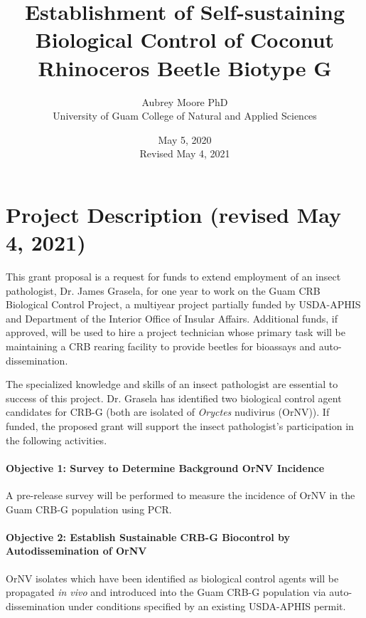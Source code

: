 \documentclass[12pt,letterpaper,english,bibliography=totocnumbered, abstract=on]{scrartcl}
\begin{document}
\titlehead{Work Plan: USDA Forest Service FY2020}

\title{Establishment of Self-sustaining Biological Control of Coconut Rhinoceros Beetle Biotype G}

\author{Aubrey Moore PhD\\University of Guam College of Natural and Applied Sciences}

\date{May 5, 2020\\Revised May 4, 2021}

\maketitle
\newpage
\tableofcontents

\pagebreak

\section{Project Description (revised May 4, 2021)}

This grant proposal is a request for funds to extend employment of an insect pathologist,
Dr. James Grasela, for one year to work on the Guam CRB Biological Control Project, a multiyear project partially funded by
USDA-APHIS and Department of the Interior Office of Insular Affairs. Additional funds, if approved, will be used to hire a project technician whose primary task will be maintaining a CRB rearing facility to provide beetles for bioassays and auto-dissemination.

The specialized knowledge and skills of an insect pathologist are essential to success of this project. 
Dr. Grasela has identified two biological control agent candidates for CRB-G (both are isolated of \textit{Oryctes} nudivirus (OrNV)).
If funded, the proposed grant will support the insect pathologist's participation in the following activities.

\paragraph{Objective 1: Survey to Determine Background OrNV Incidence} 
A pre-release survey will be performed to measure the incidence of OrNV in the Guam CRB-G population using PCR.

\paragraph{Objective 2: Establish Sustainable CRB-G Biocontrol by Autodissemination of OrNV}
OrNV isolates which have been identified as biological control agents will be propagated \textit{in vivo} and
introduced into the Guam CRB-G population via auto-dissemination under conditions specified by an existing USDA-APHIS permit.
\end{document}
